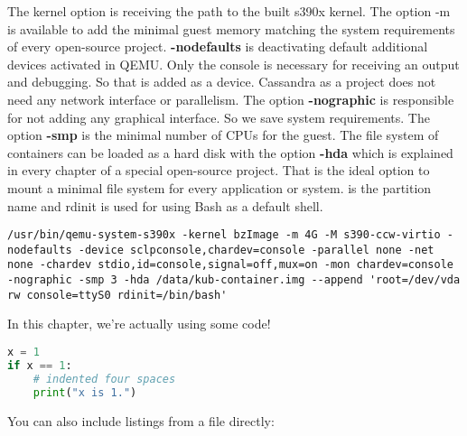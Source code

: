 The kernel option is receiving the path to the built s390x kernel. 
The option -m is available to add the minimal guest memory matching the system requirements of every open-source project. 
\textbf{-nodefaults} is deactivating default additional devices activated in QEMU. 
Only the console is necessary for receiving an output and debugging. 
So that is added as a device. Cassandra as a project does not need any network interface or parallelism. The 
option \textbf{-nographic} is responsible for not adding any graphical interface. 
So we save system requirements. The option \textbf{-smp} is the minimal number of CPUs for the guest. 
The file system of containers can be loaded as a hard disk with the option \textbf{-hda} which is explained in every chapter of a special open-source project. 
That is the ideal option to mount a minimal file system for every application or system. 
 is the partition name and rdinit is used for using Bash as a default shell. \\


\begin{lstlisting}[style=BashInputStyle]
/usr/bin/qemu-system-s390x -kernel bzImage -m 4G -M s390-ccw-virtio -nodefaults -device sclpconsole,chardev=console -parallel none -net none -chardev stdio,id=console,signal=off,mux=on -mon chardev=console -nographic -smp 3 -hda /data/kub-container.img --append 'root=/dev/vda rw console=ttyS0 rdinit=/bin/bash'
\end{lstlisting}

In this chapter, we're actually using some code!

\begin{lstlisting}[language=Python,caption={This is an example of inline listing},captionpos=b]
x = 1
if x == 1:
    # indented four spaces
    print("x is 1.")

\end{lstlisting}

You can also include listings from a file directly:


